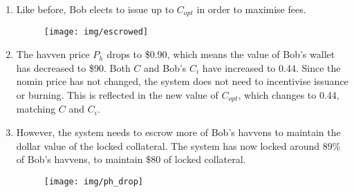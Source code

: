 \begin{enumerate}
\item{Like before, Bob elects to issue up to $C_{opt}$ in order to maximise fees.}
\begin{figure}[h!]
    \centering
    \texttt{[image: img/escrowed]}
\end{figure}
\item{The havven price $P_h$ drops to \$0.90, which means the value of Bob's wallet has decreased to \$90. Both $C$ and Bob's $C_i$ have increased to 0.44. Since the nomin price has not changed, the system does not need to incentivise issuance or burning. This is reflected in the new value of $C_{opt}$, which changes to 0.44, matching $C$ and $C_i$. }
\item{However, the system needs to escrow more of Bob's havvens to maintain the dollar value of the locked collateral. The system has now locked around 89\% of Bob's havvens, to maintain \$80 of locked collateral.}
\begin{figure}[h!]
    \centering
    \texttt{[image: img/ph\_drop]}
\end{figure}
\end{enumerate} 
